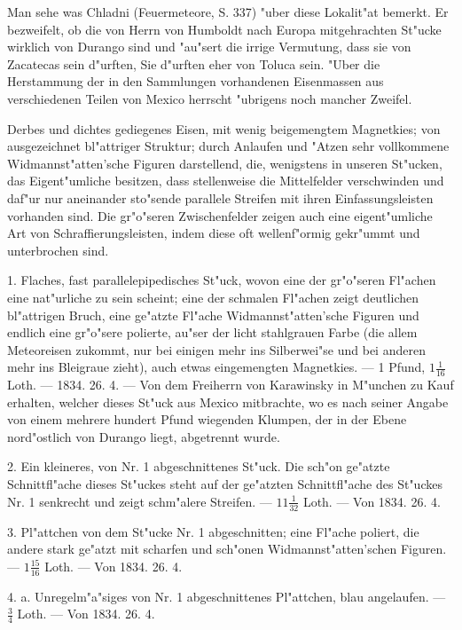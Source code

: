 \documentclass[a4paper, 11pt, oneside, polutonikogreek, german]{article}
\begin{document}
{\footnotesize Man sehe was Chladni (Feuermeteore, S. 337) "uber diese Lokalit"at bemerkt. Er bezweifelt, ob die von Herrn von Humboldt nach Europa mitgehrachten St"ucke wirklich von Durango sind und "au"sert die irrige Vermutung, dass sie von Zacatecas sein d"urften, Sie d"urften eher von Toluca sein. "Uber die Herstammung der in den Sammlungen vorhandenen Eisenmassen aus verschiedenen Teilen von Mexico herrscht "ubrigens noch mancher Zweifel.}

\setlength{\leftskip}{0pt}
\setlength{\parindent}{20pt}

Derbes und dichtes gediegenes Eisen, mit wenig beigemengtem Magnetkies; von ausgezeichnet bl"attriger Struktur; durch Anlaufen und "Atzen sehr vollkommene Widmannst"atten'sche Figuren darstellend, die, wenigstens in unseren St"ucken, das Eigent"umliche besitzen, dass stellenweise die Mittelfelder verschwinden und daf"ur nur aneinander sto"sende parallele Streifen mit ihren Einfassungsleisten vorhanden sind. Die gr"o"seren Zwischenfelder zeigen auch eine eigent"umliche Art von Schraffierungsleisten, indem diese oft wellenf"ormig gekr"ummt und unterbrochen sind.

1. Flaches, fast parallelepipedisches St"uck, wovon eine der gr"o"seren Fl"achen eine nat"urliche zu sein scheint; eine der schmalen Fl"achen zeigt deutlichen bl"attrigen Bruch, eine ge"atzte Fl"ache Widmannst"atten'sche Figuren und endlich eine gr"o"sere polierte, au"ser der licht stahlgrauen Farbe (die allem Meteoreisen zukommt, nur bei einigen mehr ins Silberwei"se und bei anderen mehr ins Bleigraue zieht), auch etwas eingemengten Magnetkies. --- 1 Pfund, $\mathfrak{1\frac{1}{16}}$ Loth. --- 1834. 26. 4. --- Von dem Freiherrn von Karawinsky in M"unchen zu Kauf erhalten, welcher dieses St"uck aus Mexico mitbrachte, wo es nach seiner Angabe von einem mehrere hundert Pfund wiegenden Klumpen, der in der Ebene nord"ostlich von Durango liegt, abgetrennt wurde.

2. Ein kleineres, von Nr. 1 abgeschnittenes St"uck. Die sch"on ge"atzte Schnittfl"ache dieses St"uckes steht auf der ge"atzten Schnittfl"ache des St"uckes Nr. 1 senkrecht und zeigt schm"alere Streifen. --- $\mathfrak{11\frac{1}{32}}$ Loth. --- Von 1834. 26. 4.

3. Pl"attchen von dem St"ucke Nr. 1 abgeschnitten; eine Fl"ache poliert, die andere stark ge"atzt mit scharfen und sch"onen Widmannst"atten'schen Figuren. --- $\mathfrak{1\frac{15}{16}}$ Loth. --- Von 1834. 26. 4.

4. a. Unregelm"a"siges von Nr. 1 abgeschnittenes Pl"attchen, blau angelaufen. --- $\mathfrak{\frac{3}{4}}$ Loth. --- Von 1834. 26. 4.
\end{document}
